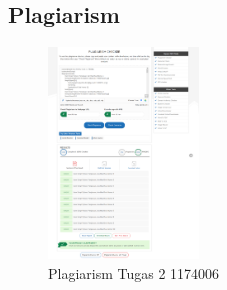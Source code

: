 \subsection{Plagiarism}
\begin{figure}[H]
	\includegraphics[width=4cm]{figures/1174006/2/plagiarism2.png}
	\centering
	\caption{Plagiarism Tugas 2 1174006}
\end{figure}